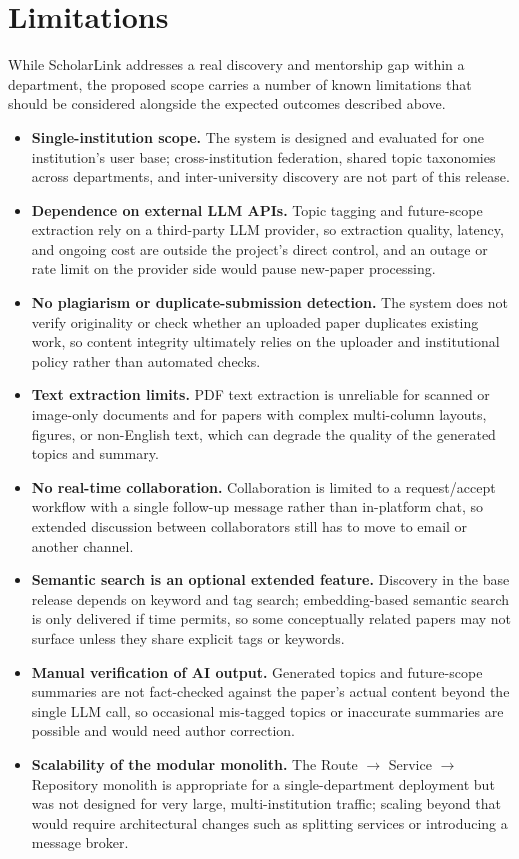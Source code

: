 \documentclass[11pt]{article}
\begin{document}
\section{Limitations}
While ScholarLink addresses a real discovery and mentorship gap within a department, the proposed scope carries a number of known limitations that should be considered alongside the expected outcomes described above.

\begin{itemize}[itemsep=2pt]
    \item \textbf{Single-institution scope.} The system is designed and evaluated for one institution's user base; cross-institution federation, shared topic taxonomies across departments, and inter-university discovery are not part of this release.
    \item \textbf{Dependence on external LLM APIs.} Topic tagging and future-scope extraction rely on a third-party LLM provider, so extraction quality, latency, and ongoing cost are outside the project's direct control, and an outage or rate limit on the provider side would pause new-paper processing.
    \item \textbf{No plagiarism or duplicate-submission detection.} The system does not verify originality or check whether an uploaded paper duplicates existing work, so content integrity ultimately relies on the uploader and institutional policy rather than automated checks.
    \item \textbf{Text extraction limits.} PDF text extraction is unreliable for scanned or image-only documents and for papers with complex multi-column layouts, figures, or non-English text, which can degrade the quality of the generated topics and summary.
    \item \textbf{No real-time collaboration.} Collaboration is limited to a request/accept workflow with a single follow-up message rather than in-platform chat, so extended discussion between collaborators still has to move to email or another channel.
    \item \textbf{Semantic search is an optional extended feature.} Discovery in the base release depends on keyword and tag search; embedding-based semantic search is only delivered if time permits, so some conceptually related papers may not surface unless they share explicit tags or keywords.
    \item \textbf{Manual verification of AI output.} Generated topics and future-scope summaries are not fact-checked against the paper's actual content beyond the single LLM call, so occasional mis-tagged topics or inaccurate summaries are possible and would need author correction.
    \item \textbf{Scalability of the modular monolith.} The Route $\rightarrow$ Service $\rightarrow$ Repository monolith is appropriate for a single-department deployment but was not designed for very large, multi-institution traffic; scaling beyond that would require architectural changes such as splitting services or introducing a message broker.
\end{itemize}
\end{document}
